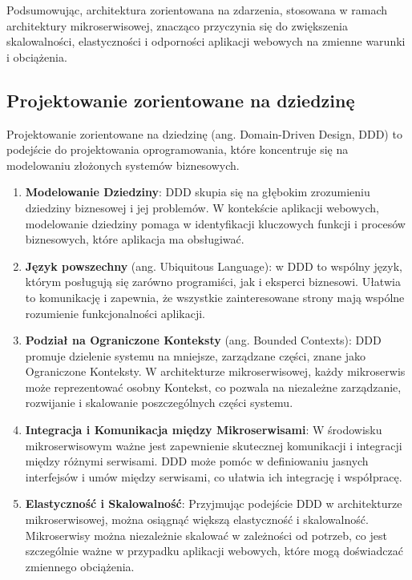 Podsumowując, architektura zorientowana na zdarzenia, stosowana w ramach architektury mikroserwisowej, znacząco przyczynia się do zwiększenia skalowalności, elastyczności i odporności aplikacji webowych na zmienne warunki i obciążenia.

\subsection{Projektowanie zorientowane na dziedzinę}

Projektowanie zorientowane na dziedzinę (ang. Domain-Driven Design, DDD) to podejście do projektowania oprogramowania, które koncentruje się na modelowaniu złożonych systemów biznesowych.

\begin{enumerate}
    \item \textbf{Modelowanie Dziedziny}: DDD skupia się na głębokim zrozumieniu dziedziny biznesowej i jej problemów. W kontekście aplikacji webowych, modelowanie dziedziny pomaga w identyfikacji kluczowych funkcji i procesów biznesowych, które aplikacja ma obsługiwać.

    \item \textbf{Język powszechny} (ang. Ubiquitous Language): w DDD to wspólny język, którym posługują się zarówno programiści, jak i eksperci biznesowi. Ułatwia to komunikację i zapewnia, że wszystkie zainteresowane strony mają wspólne rozumienie funkcjonalności aplikacji.

    \item \textbf{Podział na Ograniczone Konteksty }(ang. Bounded Contexts): DDD promuje dzielenie systemu na mniejsze, zarządzane części, znane jako Ograniczone Konteksty. W architekturze mikroserwisowej, każdy mikroserwis może reprezentować osobny Kontekst, co pozwala na niezależne zarządzanie, rozwijanie i skalowanie poszczególnych części systemu.

    \item \textbf{Integracja i Komunikacja między Mikroserwisami}: W środowisku mikroserwisowym ważne jest zapewnienie skutecznej komunikacji i integracji między różnymi serwisami. DDD może pomóc w definiowaniu jasnych interfejsów i umów między serwisami, co ułatwia ich integrację i współpracę.

    \item \textbf{Elastyczność i Skalowalność}: Przyjmując podejście DDD w architekturze mikroserwisowej, można osiągnąć większą elastyczność i skalowalność. Mikroserwisy można niezależnie skalować w zależności od potrzeb, co jest szczególnie ważne w przypadku aplikacji webowych, które mogą doświadczać zmiennego obciążenia.


\end{enumerate}
